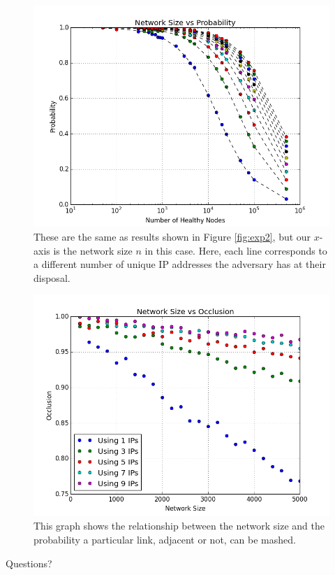 \documentclass[11pt]{beamer}
\begin{document}
    \begin{frame}
        
        \begin{figure}
            \centering
            \includegraphics[width=0.7\linewidth]{size_prob_all}
            \caption[a]{These are the same as results shown in Figure \ref{fig:exp2}, but our $x$-axis is the network size $n$ in this case.  
                Here, each line corresponds to a different number of unique IP addresses the adversary has at their disposal.}
            \label{fig:size_prob_all}
        \end{figure}
    \end{frame}
    
    \begin{frame}
        \begin{figure}
            \centering
            \includegraphics[width=0.7\linewidth]{size_occlusion_chord}
            \caption{This graph shows the relationship between the network size and the probability a particular link, adjacent or not, can be mashed.}
            \label{fig:exp3}
        \end{figure}
    \end{frame}
    
    
    \begin{frame}
        Questions?
    \end{frame}

    
    
    
\end{document}
